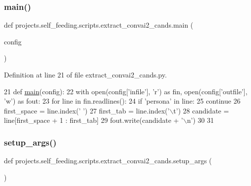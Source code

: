 \subsubsection{\texorpdfstring{main()}{main()}}
{\footnotesize\ttfamily def projects.\+self\+\_\+feeding.\+scripts.\+extract\+\_\+convai2\+\_\+cands.\+main (\begin{DoxyParamCaption}\item[{}]{config }\end{DoxyParamCaption})}



Definition at line 21 of file extract\+\_\+convai2\+\_\+cands.\+py.


\begin{DoxyCode}
21 \textcolor{keyword}{def }\hyperlink{namespaceprojects_1_1self__feeding_1_1scripts_1_1extract__convai2__cands_a6b1b88203a7adfdd0cf791d83425209b}{main}(config):
22     with open(config[\textcolor{stringliteral}{'infile'}], \textcolor{stringliteral}{'r') as fin, open(config['}outfile'], 'w') as fout:
23         \textcolor{keywordflow}{for} line \textcolor{keywordflow}{in} fin.readlines():
24             \textcolor{keywordflow}{if} \textcolor{stringliteral}{'persona'} \textcolor{keywordflow}{in} line:
25                 \textcolor{keywordflow}{continue}
26             first\_space = line.index(\textcolor{stringliteral}{' '})
27             first\_tab = line.index(\textcolor{stringliteral}{'\(\backslash\)t'})
28             candidate = line[first\_space + 1 : first\_tab]
29             fout.write(candidate + \textcolor{stringliteral}{'\(\backslash\)n'})
30 
31 
\end{DoxyCode}
\mbox{\label{namespaceprojects_1_1self__feeding_1_1scripts_1_1extract__convai2__cands_a195803e64ff287a8e844a00e6a24ceef}} 
\subsubsection{\texorpdfstring{setup\+\_\+args()}{setup\_args()}}
{\footnotesize\ttfamily def projects.\+self\+\_\+feeding.\+scripts.\+extract\+\_\+convai2\+\_\+cands.\+setup\+\_\+args (\begin{DoxyParamCaption}{ }\end{DoxyParamCaption})}



